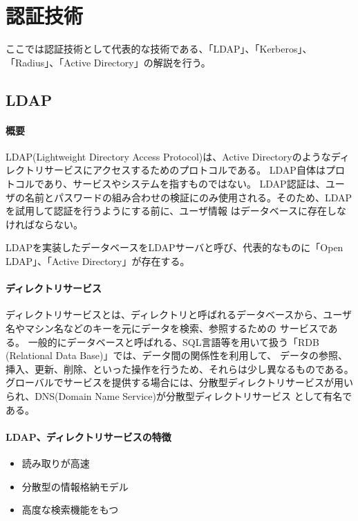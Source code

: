 \documentclass[11pt,a4j,titlepage]{jreport}
\begin{document}
\chapter{認証技術}\label{Authentication}
ここでは認証技術として代表的な技術である、「LDAP」、「Kerberos」、「Radius」、「Active Directory」の解説を行う。

\section{LDAP}
\subsubsection*{概要}
LDAP(Lightweight Directory Access Protocol)は、Active Directoryのようなディレクトリサービスにアクセスするためのプロトコルである。
LDAP自体はプロトコルであり、サービスやシステムを指すものではない。
LDAP認証は、ユーザの名前とパスワードの組み合わせの検証にのみ使用される。そのため、LDAPを試用して認証を行うようにする前に、ユーザ情報
はデータベースに存在しなければならない。

LDAPを実装したデータベースをLDAPサーバと呼び、代表的なものに「Open LDAP」、「Active Directory」が存在する。\par
\subsubsection*{ディレクトリサービス}
ディレクトリサービスとは、ディレクトリと呼ばれるデータベースから、ユーザ名やマシン名などのキーを元にデータを検索、参照するための
サービスである。
一般的にデータベースと呼ばれる、SQL言語等を用いて扱う「RDB (Relational Data Base)」では、データ間の関係性を利用して、
データの参照、挿入、更新、削除、といった操作を行うため、それらは少し異なるものである。
グローバルでサービスを提供する場合には、分散型ディレクトリサービスが用いられ、DNS(Domain Name Service)が分散型ディレクトリサービス
として有名である。

\subsubsection*{LDAP、ディレクトリサービスの特徴}

\begin{itemize}
    \item 読み取りが高速
    \item 分散型の情報格納モデル
    \item 高度な検索機能をもつ
\end{itemize}
\end{document}
